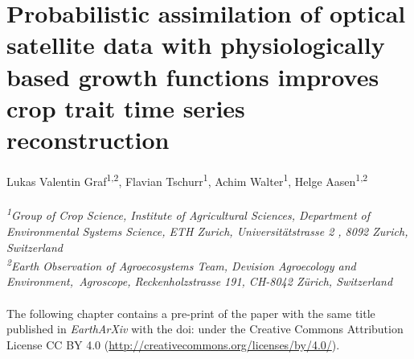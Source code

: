 \chapter{Probabilistic assimilation of optical satellite data with physiologically based growth functions improves crop trait time series reconstruction}
\label{chap:drc}
\graphicspath{{./06-DRC/img}}

Lukas Valentin Graf\textsuperscript{1,2}, Flavian Tschurr\textsuperscript{1}, Achim Walter\textsuperscript{1}, Helge Aasen\textsuperscript{1,2}
\\
\normalsize
\vspace{2pt}
\\
\textit{\textsuperscript{1}Group of Crop Science, Institute of Agricultural Sciences, Department of Environmental Systems Science, ETH Zurich, Universitätstrasse 2 , 8092 Zurich, Switzerland
\\
\textsuperscript{2}Earth Observation of Agroecosystems Team, Devision Agroecology and Environment,\ Agroscope, Reckenholzstrasse 191, CH-8042 Zürich, Switzerland
\\
\vspace{2cm}}
\\

The following chapter contains a pre-print of the paper with the same title published in \textsl{EarthArXiv} with the doi:  under the Creative Commons Attribution License CC BY 4.0 (\url{http://creativecommons.org/licenses/by/4.0/}).
\pagebreak
